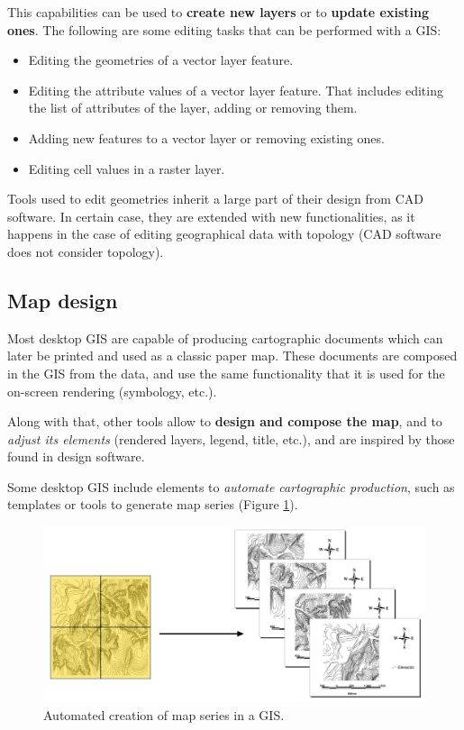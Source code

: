 This capabilities can be used to \textbf{create new layers} or to \textbf{update existing ones}. The following are some editing tasks that can be performed with a GIS:

\begin{itemize}
\item Editing the geometries of a vector layer feature.
\item Editing the attribute values of a vector layer feature. That includes editing the list of attributes of the layer, adding or removing them.
\item Adding new features to a vector layer or removing existing ones.
\item Editing cell values in a raster layer.
\end{itemize}

Tools used to edit geometries inherit a large part of their design from CAD software. In certain case, they are extended with new functionalities, as it happens in the case of editing geographical data with topology (CAD software does not consider topology).


\subsection{Map design}

Most desktop GIS are capable of producing cartographic documents which can later be printed and used as a classic paper map. These documents are composed in the GIS from the data, and use the same functionality that it is used for the on-screen rendering (symbology, etc.).

Along with that, other tools allow to \textbf{design and compose the map}, and to \emph{adjust its elements} (rendered layers, legend, title, etc.), and are inspired by those found in design software. 

Some desktop GIS include elements to \emph{automate cartographic production}, such as templates or tools to generate map series (Figure \ref{Fig:Map_series}).

\begin{figure}[!hbt]
\centering
\includegraphics[width=\textwidth]{Software/Map_series.png}
\caption{\small Automated creation of map series in a GIS.}
\label{Fig:Map_series} 
\end{figure}

